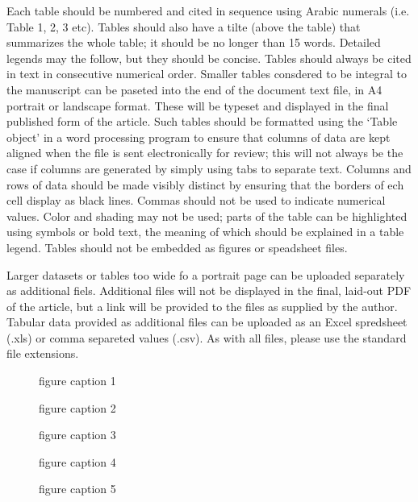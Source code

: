 \documentclass{EPS}
\begin{document}
Each table should be numbered and cited in sequence
using Arabic numerals (i.e. Table 1, 2, 3 etc).
Tables should also have a tilte (above the table)
that summarizes the whole table;
it should be no longer than 15 words.
Detailed legends may the follow, but they should be concise.
Tables should always be cited in text in consecutive numerical order.
Smaller tables consdered to be integral to the manuscript can be
paseted into the end of the document text file,
in A4 portrait or landscape format.
These will be typeset and displayed in the final published form
of the article.
Such tables should be formatted using the `Table object'
in a word processing program to ensure that
columns of data are kept aligned when the file is sent
electronically for review;
this will not always be the case if columns are generated by
simply using tabs to separate text.
Columns and rows of data should be made visibly distinct
by ensuring that the borders of ech cell display as black lines.
Commas should not be used to indicate numerical values.
Color and shading may not be used;
parts of the table can be highlighted using symbols or bold text,
the meaning of which should be explained in a table legend.
Tables should not be embedded as figures or speadsheet files.

Larger datasets or tables too wide fo a portrait page
can be uploaded separately as additional fiels.
Additional files will not be displayed in the final,
laid-out PDF of the article, but a link will be provided
to the files as supplied by the author.
Tabular data provided as additional files can be uploaded
as an Excel spredsheet (.xls) or comma separeted values (.csv).
As with all files, please use the standard file extensions.

\begin{figure}
\caption{figure caption 1}\label{fig:1}
\end{figure}

\begin{figure}
\caption{figure caption 2}\label{fig:2}
\end{figure}

\begin{figure}
\caption{figure caption 3}\label{fig:3}
\end{figure}

\begin{figure}
\caption{figure caption 4}\label{fig:4}
\end{figure}

\begin{figure}
\caption{figure caption 5}\label{fig:5}
\end{figure}
\end{document}
